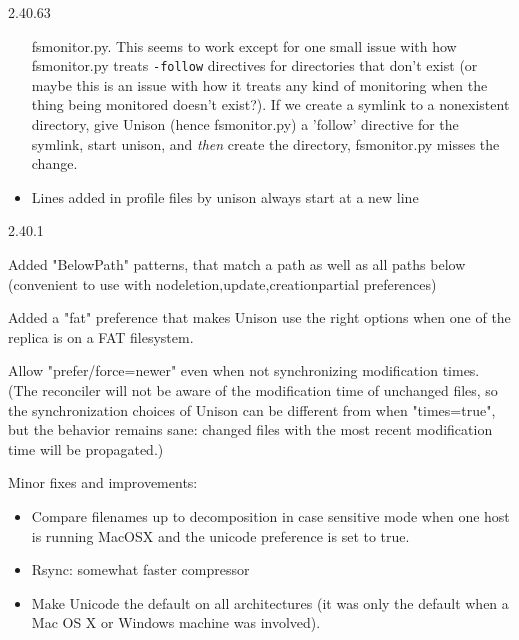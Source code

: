 \begin{changesfromversion}{2.40.63}
\begin{itemize}
  fsmonitor.py.  This seems to work except for one small issue with
  how fsmonitor.py treats {\tt -follow} directives for directories that
  don't exist (or maybe this is an issue with how it treats any kind
  of monitoring when the thing being monitored doesn't exist?).  If we
  create a symlink to a nonexistent directory, give Unison (hence
  fsmonitor.py) a 'follow' directive for the symlink, start unison, and
  {\em then} create the directory, fsmonitor.py misses the change.
\item Lines added in profile files by unison always start at a new line
\end{itemize}
\end{changesfromversion}

\begin{changesfromversion}{2.40.1}
\item Added "BelowPath" patterns, that match a path as well as all paths below
  (convenient to use with no{deletion,update,creation}partial preferences)
\item Added a "fat" preference that makes Unison use the right options
  when one of the replica is on a FAT filesystem.
\item Allow "prefer/force=newer" even when not synchronizing modification
  times.  (The reconciler will not be aware of the modification time
  of unchanged files, so the synchronization choices of Unison can be
  different from when "times=true", but the behavior remains sane:
  changed files with the most recent modification time will be
  propagated.)
\item Minor fixes and improvements:
\begin{itemize}
\item Compare filenames up to decomposition in case sensitive mode when
  one host is running MacOSX and the unicode preference is set to
  true.
\item Rsync: somewhat faster compressor
\item Make Unicode the default on all architectures (it was only the
  default when a Mac OS X or Windows machine was involved).
\end{itemize}
\end{changesfromversion}

